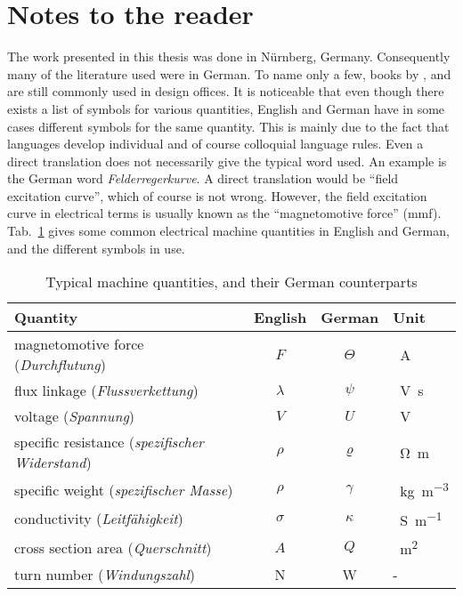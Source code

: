\section{Notes to the reader}
The work presented in this thesis was done in N\"urnberg, Germany. Consequently many of the literature used were in German. To name only a few, books by \cite{REF-00004}, \cite{REF-00429} and \cite{REF-00294} are still commonly used in design offices. It is noticeable that even though there exists a list of symbols for various quantities, English and German have in some cases different symbols for the same quantity. This is mainly due to the fact that languages develop individual and of course colloquial language rules. Even a direct translation does not necessarily give the typical word used. An example is the German word \textit{Felderregerkurve}. A direct translation would be ``field excitation curve'', which of course is not wrong. However, the field excitation curve in electrical terms is usually known as the ``magnetomotive force'' (mmf). Tab.~\ref{tab:translation} gives some common electrical machine quantities in English and German, and the different symbols in use.
\begin{table}[htbp]
  \caption[Typical machine quantities and their German translation]%
  {Typical machine quantities, and their German counterparts}
  \label{tab:translation}
  \centering
  \begin{tabular}{lccl}
  \toprule
  Quantity   &  English  & German & Unit \\
  \toprule
  magnetomotive force (\textit{Durchflutung}) & 
  $F$& $\Theta$ & \SI{}{A}\\
  \midrule
  flux linkage (\textit{Flussverkettung}) & 
  $\lambda$& $\psi$ & \SI{}{V.s}   \\
  \midrule
  voltage (\textit{Spannung})  & 
  $V$& $U$ & \SI{}{V} \\
  \midrule
  specific resistance (\textit{spezifischer Widerstand})&
  $\rho$& $\varrho$ & \SI{}{\ohm.m} \\
  \midrule
  specific weight (\textit{spezifischer Masse})&
  $\rho$& $\gamma$& \SI{}{kg.m^{-3}}\\
  \midrule
  conductivity (\textit{Leitf\"ahigkeit})&
  $\sigma$&$\kappa$& \SI{}{S.m^{-1}}\\
  \midrule
  cross section area (\textit{Querschnitt})&
  $A$&$Q$& \SI{}{m^{2}}\\
  \midrule
  turn number (\textit{Windungszahl}) & 
  N& W & - \\
  \bottomrule
  \end{tabular}
\end{table}

